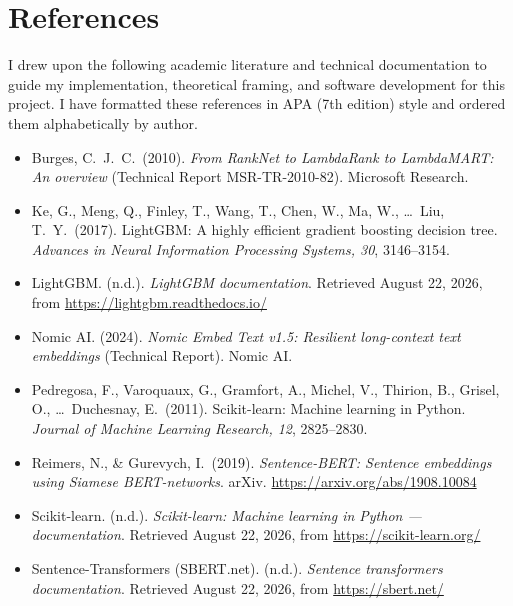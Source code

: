 \chapter{References}
\label{ch:references}

I drew upon the following academic literature and technical documentation to guide my implementation, theoretical framing, and software development for this project. I have formatted these references in APA (7th edition) style and ordered them alphabetically by author.

\begin{itemize}[leftmargin=1.25cm, itemindent=-1.25cm, label={}, itemsep=10pt]

\item Burges, C.\ J.\ C.\ (2010). \textit{From RankNet to LambdaRank to LambdaMART: An overview} (Technical Report MSR-TR-2010-82). Microsoft Research.

\item Ke, G., Meng, Q., Finley, T., Wang, T., Chen, W., Ma, W., \ldots\ Liu, T.\ Y.\ (2017). LightGBM: A highly efficient gradient boosting decision tree. \textit{Advances in Neural Information Processing Systems, 30}, 3146--3154.

\item LightGBM. (n.d.). \textit{LightGBM documentation}. Retrieved August 22, 2026, from \url{https://lightgbm.readthedocs.io/}

\item Nomic AI. (2024). \textit{Nomic Embed Text v1.5: Resilient long-context text embeddings} (Technical Report). Nomic AI.

\item Pedregosa, F., Varoquaux, G., Gramfort, A., Michel, V., Thirion, B., Grisel, O., \ldots\ Duchesnay, E.\ (2011). Scikit-learn: Machine learning in Python. \textit{Journal of Machine Learning Research, 12}, 2825--2830.

\item Reimers, N., \& Gurevych, I.\ (2019). \textit{Sentence-BERT: Sentence embeddings using Siamese BERT-networks}. arXiv. \url{https://arxiv.org/abs/1908.10084}

\item Scikit-learn. (n.d.). \textit{Scikit-learn: Machine learning in Python --- documentation}. Retrieved August 22, 2026, from \url{https://scikit-learn.org/}

\item Sentence-Transformers (SBERT.net). (n.d.). \textit{Sentence transformers documentation}. Retrieved August 22, 2026, from \url{https://sbert.net/}

\end{itemize}